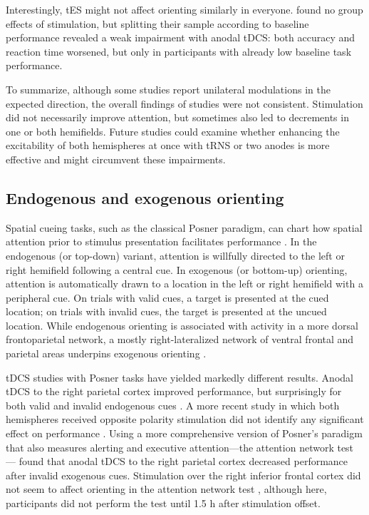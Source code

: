 \documentclass[11pt,]{memoir}
\begin{document}
Interestingly, tES might not affect orienting similarly in everyone. \textcite{Learmonth2015} found no group effects of stimulation, but splitting their sample according to baseline performance revealed a weak impairment with anodal tDCS: both accuracy and reaction time worsened, but only in participants with already low baseline task performance.

To summarize, although some studies report unilateral modulations in the expected direction, the overall findings of studies were not consistent. Stimulation did not necessarily improve attention, but sometimes also led to decrements in one or both hemifields. Future studies could examine whether enhancing the excitability of both hemispheres at once with tRNS or two anodes is more effective and might circumvent these impairments.

\hypertarget{endogenous-and-exogenous-orienting}{%
\subsection{Endogenous and exogenous orienting}\label{endogenous-and-exogenous-orienting}}

Spatial cueing tasks, such as the classical Posner paradigm, can chart how spatial attention prior to stimulus presentation facilitates performance \autocites{Chica2014}{Posner1980b}. In the endogenous (or top-down) variant, attention is willfully directed to the left or right hemifield following a central cue. In exogenous (or bottom-up) orienting, attention is automatically drawn to a location in the left or right hemifield with a peripheral cue. On trials with valid cues, a target is presented at the cued location; on trials with invalid cues, the target is presented at the uncued location. While endogenous orienting is associated with activity in a more dorsal frontoparietal network, a mostly right-lateralized network of ventral frontal and parietal areas underpins exogenous orienting \autocite{Corbetta2002}.

tDCS studies with Posner tasks have yielded markedly different results. Anodal tDCS to the right parietal cortex improved performance, but surprisingly for both valid and invalid endogenous cues \autocite{Bolognini2010}. A more recent study in which both hemispheres received opposite polarity stimulation did not identify any significant effect on performance \autocite{Li2015a}. Using a more comprehensive version of Posner's paradigm that also measures alerting and executive attention---the attention network test \autocite{Fan2002}---\textcite{Roy2015} found that anodal tDCS to the right parietal cortex decreased performance after invalid exogenous cues. Stimulation over the right inferior frontal cortex did not seem to affect orienting in the attention network test \autocite{Coffman2012}, although here, participants did not perform the test until 1.5 h after stimulation offset.
\end{document}

